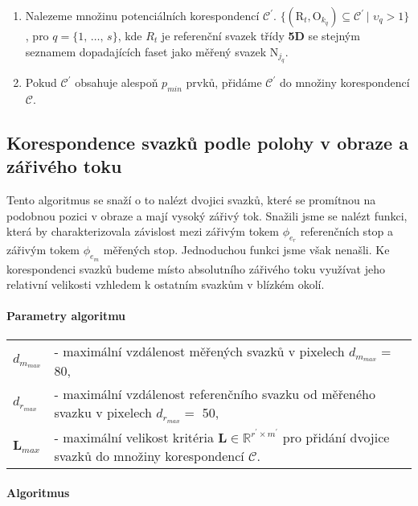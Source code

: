 \begin{enumerate}
\item Nalezeme množinu potenciálních korespondencí $\mathcal{C^\prime}$. $\lbrace \left(\mathrm{R}_t,\mathrm{O}_{k_q}\right) \subseteq \mathcal{C^\prime} \,|\,\, \upsilon_q > 1 \rbrace$, pro $q = \lbrace1,\,\dots,\,s\rbrace$, kde $R_t$ je referenční svazek třídy \textbf{5D} se stejným seznamem dopadajících faset jako měřený svazek $\mathrm{N}_{j_q}$.

\item Pokud $\mathcal{C^\prime}$ obsahuje alespoň $p_{min}$ prvků, přidáme $\mathcal{C^\prime}$ do množiny korespondencí $\mathcal{C}$.

 
\end{enumerate}

\newpage
\subsection{Korespondence svazků podle polohy v obraze a zářivého toku}
\label{sec: poloha_tok}
	Tento algoritmus se snaží o to nalézt dvojici svazků, které se promítnou na podobnou pozici v obraze a mají vysoký zářivý tok. Snažili jsme se nalézt funkci, která by charakterizovala závislost mezi zářivým tokem $\phi_{e_{r}}$ referenčních stop a zářivým tokem $\phi_{e_{m}}$ měřených stop. Jednoduchou funkci jsme však nenašli. Ke korespondenci svazků budeme místo absolutního zářivého toku využívat jeho relativní velikosti vzhledem k ostatním svazkům v blízkém okolí. 

\paragraph{Parametry algoritmu}
\hspace{1mm}
	 
	 \begin{tabular}{l l}
	 $d_{m_{max}}$ & - maximální vzdálenost měřených svazků v pixelech  $d_{m_{max}} = $ \SI{80}{\px},\\
	 $d_{r_{max}}$ & - maximální vzdálenost referenčního svazku od měřeného svazku v pixelech $d_{r_{max}} = $ \SI{50}{\px},\\
	 $\mathbf{L}_{max}$ &  - maximální velikost kritéria  $\mathbf{L} \in \mathbb{R}^{r^\prime\times m^\prime}$ pro přidání dvojice svazků do množiny korespondencí $\mathcal{C}$. \\
	 \end{tabular}

\paragraph{Algoritmus}

